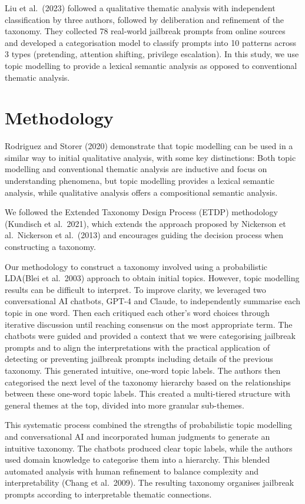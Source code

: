 \documentclass[
  letterpaper,
  DIV=11,
  numbers=noendperiod]{scrartcl}
\begin{document}
Liu et al.~(2023) followed a qualitative thematic analysis with
independent classification by three authors, followed by deliberation
and refinement of the taxonomy. They collected 78 real-world jailbreak
prompts from online sources and developed a categorisation model to
classify prompts into 10 patterns across 3 types (pretending, attention
shifting, privilege escalation). In this study, we use topic modelling
to provide a lexical semantic analysis as opposed to conventional
thematic analysis.

\section{Methodology}\label{methodology}

Rodriguez and Storer (2020) demonstrate that topic modelling can be used
in a similar way to initial qualitative analysis, with some key
distinctions: Both topic modelling and conventional thematic analysis
are inductive and focus on understanding phenomena, but topic modelling
provides a lexical semantic analysis, while qualitative analysis offers
a compositional semantic analysis.

We followed the Extended Taxonomy Design Process (ETDP) methodology
(Kundisch et al.~2021), which extends the approach proposed by Nickerson
et al.~Nickerson et al.~(2013) and encourages guiding the decision
process when constructing a taxonomy.

Our methodology to construct a taxonomy involved using a probabilistic
LDA(Blei et al.~2003) approach to obtain initial topics. However, topic
modelling results can be difficult to interpret. To improve clarity, we
leveraged two conversational AI chatbots, GPT-4 and Claude, to
independently summarise each topic in one word. Then each critiqued each
other's word choices through iterative discussion until reaching
consensus on the most appropriate term. The chatbots were guided and
provided a context that we were categorising jailbreak prompts and to
align the interpretations with the practical application of detecting or
preventing jailbreak prompts including details of the previous taxonomy.
This generated intuitive, one-word topic labels. The authors then
categorised the next level of the taxonomy hierarchy based on the
relationships between these one-word topic labels. This created a
multi-tiered structure with general themes at the top, divided into more
granular sub-themes.

This systematic process combined the strengths of probabilistic topic
modelling and conversational AI and incorporated human judgments to
generate an intuitive taxonomy. The chatbots produced clear topic
labels, while the authors used domain knowledge to categorise them into
a hierarchy. This blended automated analysis with human refinement to
balance complexity and interpretability (Chang et al.~2009). The
resulting taxonomy organises jailbreak prompts according to
interpretable thematic connections.
\end{document}

